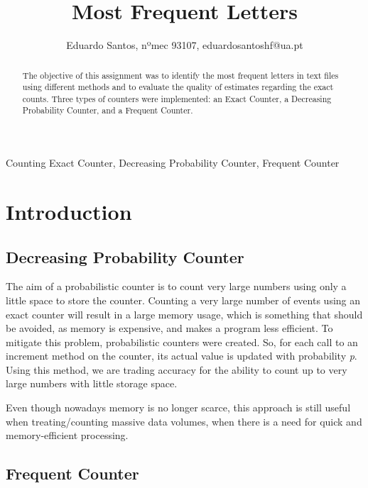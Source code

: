 \documentclass[...]{revdetua}
\begin{document}

\title{Most Frequent Letters}
\author{Eduardo Santos, nºmec 93107, eduardosantoshf@ua.pt} %
\maketitle

\begin{abstract}
The objective of this assignment was to identify the most frequent letters in text files  using different methods and to evaluate the quality of estimates regarding the exact counts. Three types of counters were implemented: an Exact Counter, a Decreasing Probability Counter, and a Frequent Counter. 
\end{abstract}

\begin{keywords}{Counting Exact Counter, Decreasing Probability Counter, Frequent Counter}
\end{keywords}

\section{Introduction}

\subsection{Decreasing Probability Counter}

The aim of a probabilistic counter is to count very large numbers using only a little space to store the counter. Counting a very large number of events using an exact counter will result in a large memory usage, which is something that should be avoided, as memory is expensive, and makes a program less efficient. To mitigate this problem, probabilistic counters were created. So, for each call to an increment method on the counter, its actual value is updated with probability \textit{p}. Using this method, we are trading accuracy for the ability to count up to very large numbers with little storage space.

Even though nowadays memory is no longer scarce, this approach is still useful when treating/counting massive data volumes, when there is a need for quick and memory-efficient processing.

\subsection{Frequent Counter}
\end{document}
